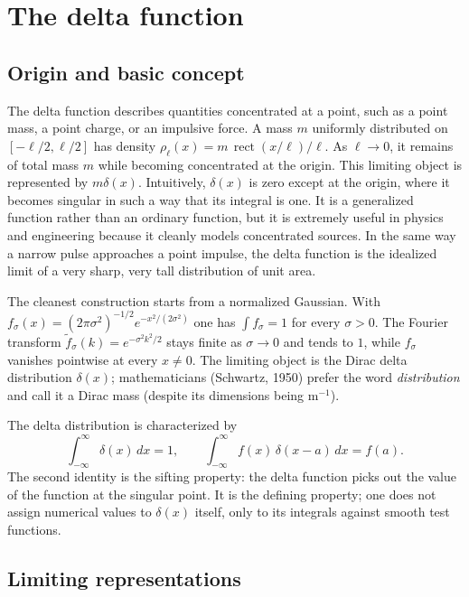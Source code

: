 \section{The delta function}

\subsection{Origin and basic concept}

The delta function describes quantities concentrated at a point, such as a point mass, a point charge, or an impulsive force. A mass $m$ uniformly distributed on $[-\ell/2,\ell/2]$ has density $\rho_\ell(x)=m\,\operatorname{rect}(x/\ell)/\ell$. As $\ell\to0$, it remains of total mass $m$ while becoming concentrated at the origin. This limiting object is represented by $m\delta(x)$. Intuitively, $\delta(x)$ is zero except at the origin, where it becomes singular in such a way that its integral is one. It is a generalized function rather than an ordinary function, but it is extremely useful in physics and engineering because it cleanly models concentrated sources. In the same way a narrow pulse approaches a point impulse, the delta function is the idealized limit of a very sharp, very tall distribution of unit area.

The cleanest construction starts from a normalized Gaussian. With $f_\sigma(x)=(2\pi\sigma^2)^{-1/2}e^{-x^2/(2\sigma^2)}$ one has $\int f_\sigma = 1$ for every $\sigma>0$. The Fourier transform $\widetilde f_\sigma(k)=e^{-\sigma^2k^2/2}$ stays finite as $\sigma\to 0$ and tends to $1$, while $f_\sigma$ vanishes pointwise at every $x\neq 0$. The limiting object is the Dirac delta distribution $\delta(x)$; mathematicians (Schwartz, 1950) prefer the word \emph{distribution} and call it a Dirac mass (despite its dimensions being $\mathrm{m}^{-1}$).

The delta distribution is characterized by
\begin{equation}
\int_{-\infty}^{\infty}\delta(x)\,dx=1,
\qquad
\int_{-\infty}^{\infty}f(x)\,\delta(x-a)\,dx=f(a).
\end{equation}
The second identity is the sifting property: the delta function picks out the value of the function at the singular point. It is the defining property; one does not assign numerical values to $\delta(x)$ itself, only to its integrals against smooth test functions.

\subsection{Limiting representations}

